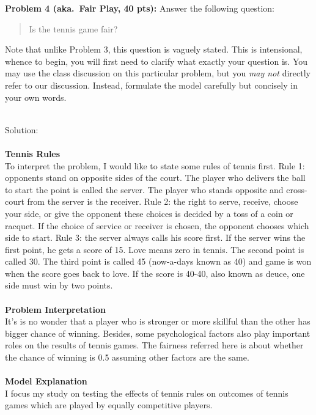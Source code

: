 \documentclass[12pt]{article}
\begin{document}
\newpage
\vskip0.25in
\noindent\textbf{Problem 4 (aka.\ Fair Play, 40 pts):}
Answer the following question:
\begin{verse}
Is the tennis game fair?
\end{verse}
Note that unlike Problem 3, this question is vaguely stated.
This is intensional, whence to begin, you will first need to clarify
what exactly your question is.
You may use the class discussion on this particular 
problem, but you \emph{may not} directly refer to our 
discussion.  Instead, formulate the model carefully but concisely in 
your own words.   

\noindent\ \\Solution:\\
\\
\textbf{Tennis Rules}\\
To interpret the problem, I would like to state some rules of tennis first. Rule 1: opponents stand on opposite sides of the court. The player who delivers the ball to start the point is called the server. The player who stands opposite and cross-court from the server is the receiver. Rule 2: the right to serve, receive, choose your side, or give the opponent these choices is decided by a toss of a coin or racquet. If the choice of service or receiver is chosen, the opponent chooses which side to start. Rule 3: the server always calls his score first. If the server wins the first point, he gets a score of 15. Love means zero in tennis. The second point is called 30. The third point is called 45 (now-a-days known as 40) and game is won when the score goes back to love. If the score is 40-40, also known as deuce, one side must win by two points. 
\\
\\
\textbf{Problem Interpretation}\\
It's is no wonder that a player who is stronger or more skillful than the other has bigger chance of winning. Besides, some psychological factors also play important roles on the results of tennis games. The fairness referred here is about whether the chance of winning is 0.5 assuming other factors are the same. \\
\\
\textbf{Model Explanation}\\
I focus my study on testing the effects of tennis rules on outcomes of tennis games which are played by equally competitive players.\\
\\
\end{document}

